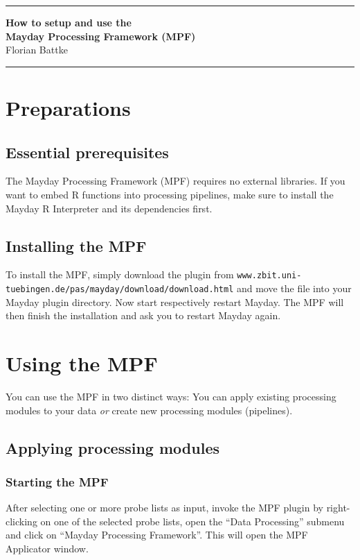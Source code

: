 \documentclass[11pt,fleqn,a4paper]{article}
\newcommand{\may}{Mayday}
\newcommand{\mpfURL}{\texttt{www.zbit.uni-tuebingen.de/pas/mayday/download/download.html}}
\newcommand{\documenttitle}{How to setup and use the\\ \may{} Processing Framework (MPF)}
\newcommand{\pluginauthors}{Florian Battke}
\begin{document}
  \vspace{20pt}

  \rule[10pt]{\textwidth}{.7pt}
  {\bfseries{
  \LARGE{
  \documenttitle
  }}}
  \vspace{5pt}\\
  \pluginauthors \\
  \rule[-0pt]{\textwidth}{.7pt}

  \sloppy


\section*{Preparations}
\subsection*{Essential prerequisites}

The \may{} Processing Framework (MPF) requires no external libraries. If you want to embed R functions into processing pipelines, make sure to install the \may{} R Interpreter and its dependencies first.

\subsection*{Installing the MPF}

To install the MPF, simply download the plugin from \mpfURL{} and move the file into your \may{} plugin directory. Now start respectively restart \may. The MPF will then finish the installation and ask you to restart \may{} again.

\section*{Using the MPF}

You can use the MPF in two distinct ways: You can apply existing processing modules to your data \emph{or} create new processing modules (pipelines).

\subsection*{Applying processing modules}

\subsubsection*{Starting the MPF}

After selecting one or more probe lists as input, invoke the MPF plugin by right-clicking on one of the selected probe lists, open the ``Data Processing'' submenu and click on ``Mayday Processing Framework''. This will open the MPF Applicator window.
\end{document}
